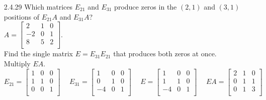 \documentclass[10pt,twoside,reqno]{article}
\begin{document}
\begin{enumerate}
\vspace{1mm}
\hspace{10pt}(b) If 
$
$$
A=
\begin{bmatrix}
0&1&0 \\
0&0&1 \\
0&0&0 \\
\end{bmatrix}
$$
$
 then $A^2 \neq 0$ but $A^3=0$. \\
\vspace{3mm}
\item[2.4.29]Which matrices $E_{21}$ and $E_{31}$ produce zeros in the $(2, 1)$ and $(3, 1)$ positions of $E_{21} A$ and $E_{31}A$? \\
\vspace{3mm}
\hspace{162pt}
$
$$
A=
\begin{bmatrix}
2&1&0 \\
-2&0&1 \\
8&5&2 \\
\end{bmatrix}
$$
$. \\
\vspace{3mm}
Find the single matrix $E = E_{31} E_{21}$ that produces both zeros at once. Multiply $EA$. \\
\vspace{3mm}
\hspace{15pt}
$
$$
E_{21}=
\begin{bmatrix}
1&0&0 \\
1&1&0 \\
0&0&1 \\
\end{bmatrix}
\hspace{15pt}
E_{31}=
\begin{bmatrix}
1&0&0 \\
0&1&0 \\
-4&0&1 \\
\end{bmatrix}
\hspace{15pt}
E=
\begin{bmatrix}
1&0&0 \\
1&1&0 \\
-4&0&1 \\
\end{bmatrix}
\hspace{15pt}
EA=
\begin{bmatrix}
2&1&0 \\
0&1&1 \\
0&1&3 \\
\end{bmatrix}
$$
$ \\
\vspace{3mm}
\end{enumerate}
\end{document}
